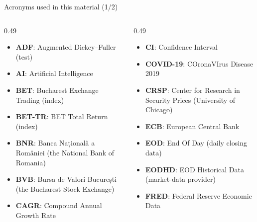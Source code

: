 \providecommand{\sfmapplink}[3]{\hypertarget{#2}{}\hyperlink{#1}{\beamergotobutton{#3}}}  %
\providecommand{\sfmappback}[2]{\begin{tikzpicture}[remember picture,overlay]\node[anchor=south east] at ([xshift=-3mm,yshift=7mm]current page.south east){\hyperlink{#1}{\beamerreturnbutton{#2}}};\end{tikzpicture}}  %
\providecommand{\sfmchlink}[2]{\href{#1}{#2}}  %
\providecommand{\sfmchlinkt}[2]{\href{#1}{\usebeamercolor[fg]{frametitle}#2}}  %


{
\begin{frame}[noframenumbering]
    \titlepage
\end{frame}
}
\begin{frame}{Acronyms used in this material (1/2)}
\begin{columns}[T]
\begin{column}{0.49\textwidth}
\begin{itemize}\setlength{\itemsep}{0pt}
    \item \textbf{ADF}: Augmented Dickey–Fuller (test)
    \item \textbf{AI}: Artificial Intelligence
    \item \textbf{BET}: Bucharest Exchange Trading (index)
    \item \textbf{BET-TR}: BET Total Return (index)
    \item \textbf{BNR}: Banca Națională a României (the National Bank of Romania)
    \item \textbf{BVB}: Bursa de Valori București (the Bucharest Stock Exchange)
    \item \textbf{CAGR}: Compound Annual Growth Rate
\end{itemize}
\end{column}
\begin{column}{0.49\textwidth}
\begin{itemize}\setlength{\itemsep}{0pt}
    \item \textbf{CI}: Confidence Interval
    \item \textbf{COVID-19}: COronaVIrus Disease 2019
    \item \textbf{CRSP}: Center for Research in Security Prices (University of Chicago)
    \item \textbf{ECB}: European Central Bank
    \item \textbf{EOD}: End Of Day (daily closing data)
    \item \textbf{EODHD}: EOD Historical Data (market-data provider)
    \item \textbf{FRED}: Federal Reserve Economic Data
\end{itemize}
\end{column}
\end{columns}
\end{frame}
